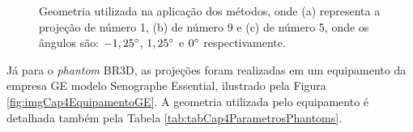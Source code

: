 \begin{figure}[t!]
	\centering
	
	\caption{Geometria utilizada na aplicação dos métodos, onde (a) representa a projeção de número 1, (b) de número 9 e (c) de número 5, onde os ângulos são: $-1,25\degree$, $1,25\degree$ e $0\degree$ respectivamente.}
	
	
	
	\label{fig:imgCap4GeometriaProjecao}
\end{figure}

 

Já para o \textit{phantom} BR3D, as projeções foram realizadas em um equipamento da empresa \acs{GE} modelo Senographe Essential\texttrademark, ilustrado pela Figura \ref{fig:imgCap4EquipamentoGE}. A geometria utilizada pelo equipamento é detalhada também pela Tabela \ref{tab:tabCap4ParametrosPhantoms}.

